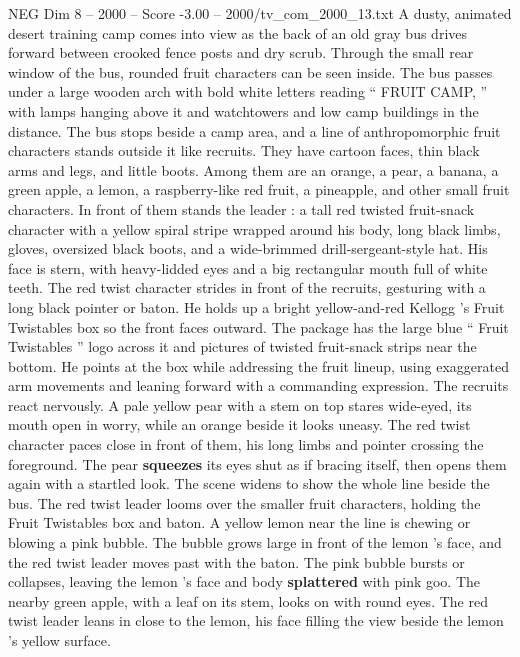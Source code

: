 \begin{textsample}{NEG Dim 8 – 2000 – Score -3.00 – 2000/tv\_com\_2000\_13.txt}  \label{ex:f8_neg_083}
A dusty, animated desert training camp comes into view as the back of an old gray bus drives forward between crooked fence posts and dry scrub.
Through the small rear window of the bus, rounded fruit characters can be seen inside.
The bus passes under a large wooden arch with bold white letters reading “ FRUIT CAMP, ” with lamps hanging above it and watchtowers and low camp buildings in the distance.
The bus stops beside a camp area, and a line of anthropomorphic fruit characters stands outside it like recruits.
They have cartoon faces, thin black arms and legs, and little boots.
Among them are an orange, a pear, a banana, a green apple, a lemon, a raspberry-like red fruit, a pineapple, and other small fruit characters.
In front of them stands the leader : a tall red twisted fruit-snack character with a yellow spiral stripe wrapped around his body, long black limbs, gloves, oversized black boots, and a wide-brimmed drill-sergeant-style hat.
His face is stern, with heavy-lidded eyes and a big rectangular mouth full of white teeth.
The red twist character strides in front of the recruits, gesturing with a long black pointer or baton.
He holds up a bright yellow-and-red Kellogg ’s Fruit Twistables box so the front faces outward.
The package has the large blue “ Fruit Twistables ” logo across it and pictures of twisted fruit-snack strips near the bottom.
He points at the box while addressing the fruit lineup, using exaggerated arm movements and leaning forward with a commanding expression.
The recruits react nervously.
A pale yellow pear with a stem on top stares wide-eyed, its mouth open in worry, while an orange beside it looks uneasy.
The red twist character paces close in front of them, his long limbs and pointer crossing the foreground.
The pear \textbf{squeezes} its eyes shut as if bracing itself, then opens them again with a startled look.
The scene widens to show the whole line beside the bus.
The red twist leader looms over the smaller fruit characters, holding the Fruit Twistables box and baton.
A yellow lemon near the line is chewing or blowing a pink bubble.
The bubble grows large in front of the lemon ’s face, and the red twist leader moves past with the baton.
The pink bubble bursts or collapses, leaving the lemon ’s face and body \textbf{splattered} with pink goo.
The nearby green apple, with a leaf on its stem, looks on with round eyes.
The red twist leader leans in close to the lemon, his face filling the view beside the lemon ’s yellow surface.

\end{textsample}
